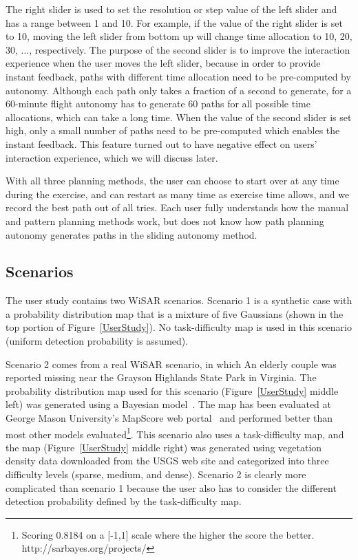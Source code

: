 \documentclass[journal]{IEEEtran}
\begin{document}
The right slider is used to set the resolution or step value of the left slider and has a range between 1 and 10. For example, if the value of the right slider is set to 10, moving the left slider from bottom up will change time allocation to 10, 20, 30, ..., respectively. The purpose of the second slider is to improve the interaction experience when the user moves the left slider, because in order to provide instant feedback, paths with different time allocation need to be pre-computed by autonomy. Although each path only takes a fraction of a second to generate, for a 60-minute flight autonomy has to generate 60 paths for all possible time allocations, which can take a long time. When the value of the second slider is set high, only a small number of paths need to be pre-computed which enables the instant feedback. This feature turned out to have negative effect on users' interaction experience, which we will discuss later.

With all three planning methods, the user can choose to start over at any time during the exercise, and can restart as many time as exercise time allows, and we record the best path out of all tries. Each user fully understands how the manual and pattern planning methods work, but does not know how path planning autonomy generates paths in the sliding autonomy method.

\subsection{Scenarios}

The user study contains two WiSAR scenarios. Scenario 1 is a synthetic case with a probability distribution map that is a mixture of five Gaussians (shown in the top portion of Figure~\ref{UserStudy}). No task-difficulty map is used in this scenario (uniform detection probability is assumed). 

Scenario 2 comes from a real WiSAR scenario, in which An elderly couple was reported missing near the Grayson Highlands State Park in Virginia. The probability distribution map used for this scenario (Figure~\ref{UserStudy} middle left) was generated using a Bayesian model~\cite{Lin2010Bayesian}. The map has been evaluated at George Mason University's MapScore web portal~\cite{Twardy2012MapScore} and performed better than most other models evaluated\footnote{Scoring 0.8184 on a [-1,1] scale where the higher the score the better. http://sarbayes.org/projects/}. This scenario also uses a task-difficulty map, and the map (Figure~\ref{UserStudy} middle right) was generated using vegetation density data downloaded from the USGS web site and categorized into three difficulty levels (sparse, medium, and dense).	Scenario 2 is clearly more complicated than scenario 1 because the user also has to consider the different detection probability defined by the task-difficulty map.
\end{document}
